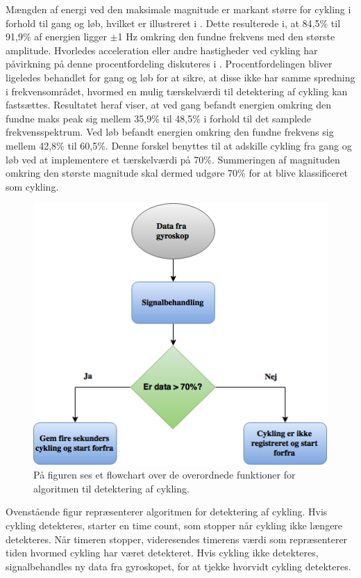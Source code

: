 Mængden af energi ved den maksimale magnitude er markant større for cykling i forhold til gang og løb, hvilket er illustreret i . Dette resulterede i, at 84,5\% til 91,9\% af energien ligger $\pm$1 Hz omkring den fundne frekvens med den største amplitude. Hvorledes acceleration eller andre hastigheder ved cykling har påvirkning på denne procentfordeling diskuteres i . Procentfordelingen bliver ligeledes behandlet for gang og løb for at sikre, at disse ikke har samme spredning i frekvensområdet, hvormed en mulig tærskelværdi til detektering af cykling kan fastsættes. Resultatet heraf viser, at ved gang befandt energien omkring den fundne maks peak sig mellem 35,9\% til 48,5\% i forhold til det samplede frekvensspektrum. Ved løb befandt energien omkring den fundne frekvens sig mellem 42,8\% til 60,5\%. Denne forskel benyttes til at adskille cykling fra gang og løb ved at implementere et tærskelværdi på 70\%. Summeringen af magnituden omkring den største magnitude skal dermed udgøre 70\% for at blive klassificeret som cykling. 
\begin{figure}[H]
	\centering
	\includegraphics[scale=0.6]{figures/cDesign/algoritme_cykling.png}
	\caption{På figuren ses et flowchart over de overordnede funktioner for algoritmen til detektering af cykling.}
	\label{fig:algoritme_cykling}
\end{figure}
Ovenstående figur repræsenterer algoritmen for detektering af cykling. Hvis cykling detekteres, starter en time count, som stopper når cykling ikke længere detekteres. Når timeren stopper, videresendes timerens værdi som repræsenterer tiden hvormed cykling har været detekteret. Hvis cykling ikke detekteres, signalbehandles ny data fra gyroskopet, for at tjekke hvorvidt cykling detekteres.
